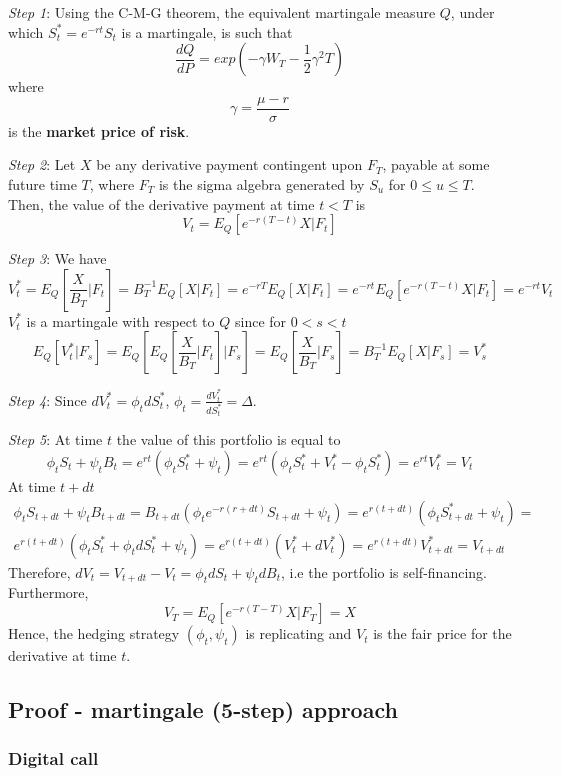 \documentclass[11pt,a4paper]{book}
\theoremstyle{definition}\newtheorem{definition}{Definition}
\theoremstyle{definition}\newtheorem{fact}{Fact}
\theoremstyle{definition}\newtheorem{remark}{Remark}
\theoremstyle{definition}\newtheorem{ex}{Ex.}
\theoremstyle{definition}\newtheorem{project}{Project}
\theoremstyle{definition}\newtheorem{problem}{Problem}
\theoremstyle{definition}\newtheorem{example}{Example}
\numberwithin{theorem}{section}
\numberwithin{corollary}{chapter}
\numberwithin{assumption}{chapter}
\numberwithin{definition}{chapter}
\numberwithin{prop}{chapter}
\numberwithin{notation}{chapter}
\numberwithin{problem}{chapter}
\numberwithin{example}{chapter}
\numberwithin{fact}{chapter}
\numberwithin{ex}{chapter}
\begin{document}
\textit{Step 1}:
Using the C-M-G theorem, the equivalent martingale measure $Q$, under which $S_t^* = e^{-rt}S_t$ is a martingale, is such that
$$ \frac{dQ}{dP} = exp \left( -\gamma W_T - \frac{1}{2} \gamma^2 T \right) $$
where
$$ \gamma = \frac{\mu - r}{\sigma} $$
is the \textbf{market price of risk}.

\textit{Step 2}:
Let $X$ be any derivative payment contingent upon $F_T$, payable at some future time $T$, where $F_T$ is the sigma algebra generated by $S_u$ for $0 \leq u \leq T$. Then, the value of the derivative payment at time $t<T$ is
$$ V_t = E_Q[e^{-r(T-t)}X|F_t] $$

\textit{Step 3}:
We have
$$ V_t^* = E_Q \left[ \frac{X}{B_T} | F_t \right] = B_T^{-1} E_Q[X|F_t] = e^{-rT} E_Q[X|F_t] = e^{-rt}E_Q[e^{-r(T-t)}X|F_t] = e^{-rt}V_t $$
$V_t^*$ is a martingale with respect to $Q$ since for $0<s<t$
$$ E_Q[V_t^*|F_s] = E_Q\left[ E_Q \left[ \frac{X}{B_T}|F_t \right] | F_s \right] = E_Q \left[ \frac{X}{B_T} | F_s \right] = B_T^{-1} E_Q[X|F_s] = V_s^* $$

\textit{Step 4}:
Since $dV_t^* = \phi_t dS_t^*$, $\phi_t = \frac{dV_t^*}{dS_t^*} = \Delta$.

\textit{Step 5}:
At time $t$ the value of this portfolio is equal to
$$\phi_t S_t + \psi_t B_t = e^{rt} (\phi_t S_t^* + \psi_t)  = e^{rt} (\phi_t S_t^* + V_t^* - \phi_t S_t^*) = e^{rt} V_t^* = V_t $$
At time $t+dt$
\begin{align*}
\phi_t S_{t+dt} + \psi_t B_{t+dt} = B_{t+dt} (\phi_t e^{-r(r+dt)}S_{t+dt} + \psi_t) = e^{r(t+dt)} (\phi_t S_{t+dt}^* + \psi_t) = \\
e^{r(t+dt)} (\phi_t S_t^* + \phi_t dS_t^* + \psi_t) = e^{r(t+dt)} (V_t^* + dV_t^*) = e^{r(t+dt)} V_{t+dt}^* = V_{t+dt}
\end{align*}
Therefore, $dV_t = V_{t+dt} - V_t = \phi_t dS_t + \psi_t dB_t$, i.e the portfolio is self-financing. Furthermore,
$$ V_T = E_Q[e^{-r(T-T)}X|F_T] = X $$
Hence, the hedging strategy $(\phi_t, \psi_t)$ is replicating and $V_t$ is the fair price for the derivative at time $t$.


\subsection{Proof - martingale (5-step) approach}

\subsubsection*{Digital call}
\end{document}
